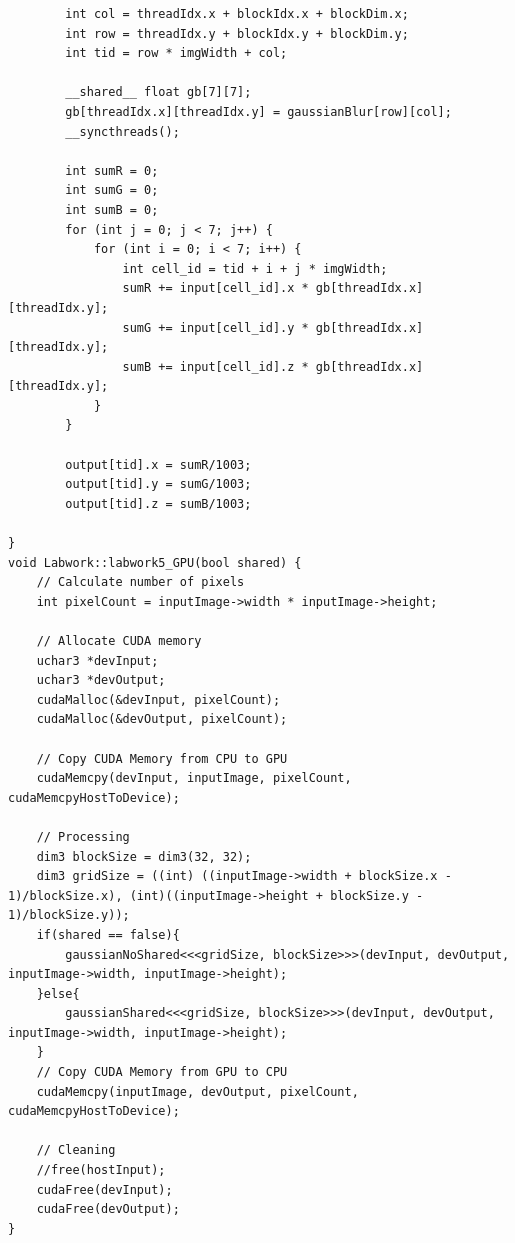 \documentclass{article}
\begin{document}
\begin{lstlisting}
        int col = threadIdx.x + blockIdx.x + blockDim.x;
        int row = threadIdx.y + blockIdx.y + blockDim.y;
        int tid = row * imgWidth + col;

        __shared__ float gb[7][7];
        gb[threadIdx.x][threadIdx.y] = gaussianBlur[row][col];
        __syncthreads();

        int sumR = 0;
        int sumG = 0;
        int sumB = 0;
        for (int j = 0; j < 7; j++) {
            for (int i = 0; i < 7; i++) {
                int cell_id = tid + i + j * imgWidth;
                sumR += input[cell_id].x * gb[threadIdx.x][threadIdx.y];
                sumG += input[cell_id].y * gb[threadIdx.x][threadIdx.y];
                sumB += input[cell_id].z * gb[threadIdx.x][threadIdx.y];
            }
        }
    
        output[tid].x = sumR/1003;
        output[tid].y = sumG/1003;
        output[tid].z = sumB/1003;

}
void Labwork::labwork5_GPU(bool shared) {
    // Calculate number of pixels
    int pixelCount = inputImage->width * inputImage->height;	

    // Allocate CUDA memory    
    uchar3 *devInput;
    uchar3 *devOutput;
    cudaMalloc(&devInput, pixelCount);
    cudaMalloc(&devOutput, pixelCount);
    
    // Copy CUDA Memory from CPU to GPU
    cudaMemcpy(devInput, inputImage, pixelCount, cudaMemcpyHostToDevice);

    // Processing
    dim3 blockSize = dim3(32, 32);
    dim3 gridSize = ((int) ((inputImage->width + blockSize.x - 1)/blockSize.x), (int)((inputImage->height + blockSize.y - 1)/blockSize.y));
    if(shared == false){
        gaussianNoShared<<<gridSize, blockSize>>>(devInput, devOutput, inputImage->width, inputImage->height);
    }else{
        gaussianShared<<<gridSize, blockSize>>>(devInput, devOutput, inputImage->width, inputImage->height);
    }
    // Copy CUDA Memory from GPU to CPU
    cudaMemcpy(inputImage, devOutput, pixelCount, cudaMemcpyHostToDevice);

    // Cleaning
    //free(hostInput);
    cudaFree(devInput);
    cudaFree(devOutput);
}

\end{lstlisting}
\end{document}
